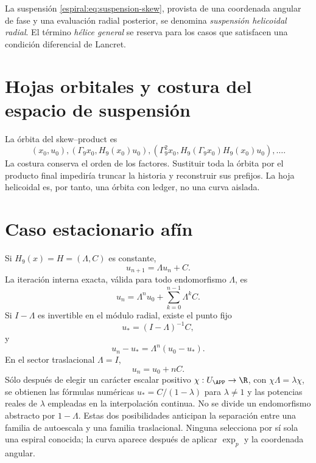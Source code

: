 \begin{definition}
La suspensión \cref{espiral:eq:suspension-skew}, provista de una coordenada angular
de fase y una evaluación radial posterior, se denomina \emph{suspensión
helicoidal radial}. El término \emph{hélice general} se reserva para los
casos que satisfacen una condición diferencial de Lancret.
\end{definition}

\section{Hojas orbitales y costura del espacio de suspensión}

La órbita del skew--product es
\[
 (x_0,u_0),
 (\Gamma_9x_0,H_9(x_0)u_0),
 (\Gamma_9^2x_0,H_9(\Gamma_9x_0)H_9(x_0)u_0),\ldots.
\]
La costura conserva el orden de los factores. Sustituir toda la órbita por el
producto final impediría truncar la historia y reconstruir sus prefijos. La
hoja helicoidal es, por tanto, una órbita con ledger, no una curva aislada.

\section{Caso estacionario afín}

Si \(H_9(x)=H=(\Lambda,C)\) es constante,
\[
 u_{n+1}=\Lambda u_n+C.
\]
La iteración interna exacta, válida para todo endomorfismo \(\Lambda\), es
\begin{equation}
 u_n=\Lambda^n u_0+\sum_{k=0}^{n-1}\Lambda^kC.
 \label{espiral:eq:orbita-afin-estacionaria-general}
\end{equation}
Si \(I-\Lambda\) es invertible en el módulo radial, existe el punto fijo
\[
 u_*=(I-\Lambda)^{-1}C,
\]
y
\begin{equation}
 u_n-u_*=\Lambda^n(u_0-u_*).
 \label{espiral:eq:orbita-afin-estacionaria}
\end{equation}
En el sector traslacional \(\Lambda=I\),
\[
 u_n=u_0+nC.
\]
Sólo después de elegir un carácter escalar positivo
\(\chi:U_{\APP}\to\R\), con
\(\chi\Lambda=\lambda\chi\), se obtienen las fórmulas numéricas
\(u_*=C/(1-\lambda)\) para \(\lambda\neq1\) y las potencias reales de
\(\lambda\) empleadas en la interpolación continua. No se divide un
endomorfismo abstracto por \(1-\Lambda\).
Estas dos posibilidades anticipan la separación entre una familia de
autoescala y una familia traslacional. Ninguna selecciona por sí sola una
espiral conocida; la curva aparece después de aplicar \(\exp_p\) y la
coordenada angular.

